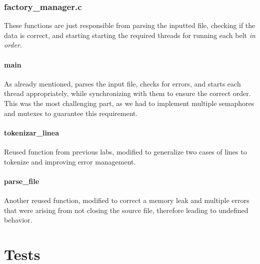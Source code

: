 \documentclass[es]{uc3mreport}
\begin{document}
\begin{report}
      \section{factory\_manager.c}

      \setcounter{subsection}{0}

      \setcounter{subsubsection}{0}

      These functions are just responsible from parsing the inputted
      file, checking if the data is correct, and starting starting the
      required threads for running each belt \emph{in order}.

      \subsection{main}

      \setcounter{subsubsection}{0}

      As already mentioned, parses the input file, checks for errors,
      and starts each thread appropriately, while synchronizing with
      them to ensure the correct order. This was the most challenging
      part, as we had to implement multiple semaphores and mutexes to
      guarantee this requirement.

      \subsection{tokenizar\_linea}

      \setcounter{subsubsection}{0}

      Reused function from previous labs, modified to generalize two
      cases of lines to tokenize and improving error management.

      \subsection{parse\_file}

      \setcounter{subsubsection}{0}

      Another reused function, modified to correct a memory leak and
      multiple errors that were arising from not closing the source
      file, therefore leading to undefined behavior.

      \part{Tests}

      \setcounter{section}{0}


\end{report}
\end{document}
